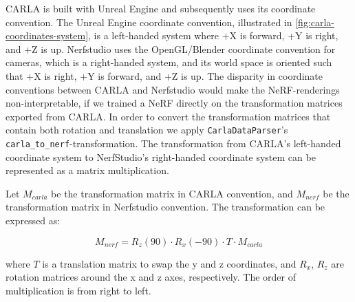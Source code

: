 CARLA is built with Unreal Engine and subsequently uses its coordinate convention. The Unreal Engine coordinate convention, illustrated in \autoref{fig:carla-coordinates-system}, is a left-handed system where +X is forward, +Y is right, and +Z is up. Nerfstudio uses the OpenGL/Blender coordinate convention for cameras, which is a right-handed system, and its world space is oriented such that +X is right, +Y is forward, and +Z is up. The disparity in coordinate conventions between CARLA and Nerfstudio would make the NeRF-renderings non-interpretable, if we trained a NeRF directly on the transformation matrices exported from CARLA. In order to convert the transformation matrices that contain both rotation and translation we apply \texttt{CarlaDataParser}'s \texttt{carla\_to\_nerf}-transformation. The transformation from CARLA's left-handed coordinate system to NerfStudio's right-handed coordinate system can be represented as a matrix multiplication.

Let $M_{carla}$ be the transformation matrix in CARLA convention, and $M_{nerf}$ be the transformation matrix in Nerfstudio convention. The transformation can be expressed as:

$$M_{nerf} = R_{z}(90) \cdot R_{x}(-90) \cdot T \cdot M_{carla} $$

where $T$ is a translation matrix to swap the y and z coordinates, and $R_{x}$, $R_{z}$ are rotation matrices around the x and z axes, respectively. The order of multiplication is from right to left.

